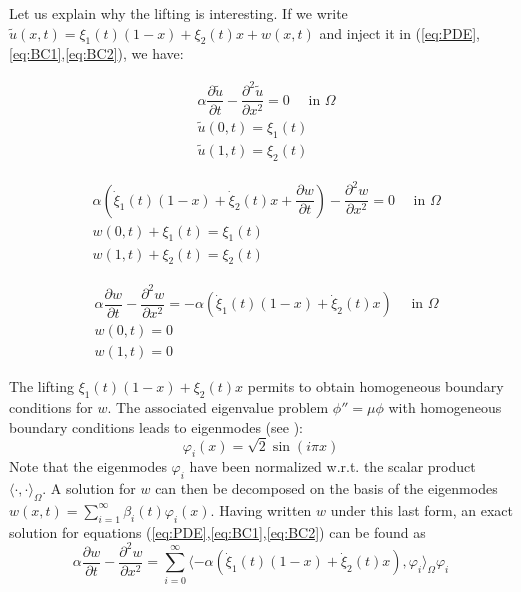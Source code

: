 Let us explain why the lifting is interesting. 
If we write $\tilde u(x,t) =  \xi_1(t)(1-x) + \xi_2(t)x + w(x,t)$ and inject it in (\ref{eq:PDE},\ref{eq:BC1},\ref{eq:BC2}),
we have:


\begin{align*}
& \alpha \dfrac{\partial \tilde u}{ \partial t} -  \dfrac{\partial^2 \tilde u}{ \partial x^2} = 0 \quad\mbox{ in } \Omega \\
& \tilde u (0,t) = \xi_1(t) \\
& \tilde u (1,t) = \xi_2(t)
\end{align*}


\begin{align*} 
& \alpha \left( \dot \xi_1(t)(1-x) + \dot \xi_2(t)x + \dfrac{\partial w}{ \partial t} \right) -  \dfrac{\partial^2 w}{ \partial x^2} = 0 \quad\mbox{ in } \Omega \\
& w(0,t) + \xi_1(t) = \xi_1(t) \\
& w (1,t) + \xi_2(t) = \xi_2(t)
\end{align*}

\begin{align*}
& \alpha \dfrac{\partial w}{ \partial t}  -  \dfrac{\partial^2 w}{ \partial x^2} = -\alpha ( \dot \xi_1(t)(1-x) + \dot \xi_2(t)x) \quad\mbox{ in } \Omega \\
& w(0,t) = 0 \\
& w(1,t) = 0
\end{align*}


The lifting $\xi_1(t)(1-x) + \xi_2(t)x$ permits to obtain homogeneous boundary conditions
for $w$.
The associated eigenvalue problem $\phi'' = \mu \phi$ with homogeneous boundary 
conditions leads to eigenmodes (see \cite{cain2005separation}):
\begin{equation}
\varphi_i(x) = \sqrt{2} \sin{(i \pi x)}
\label{eq:modes}
\end{equation}
Note that the eigenmodes $\varphi_i$ have been normalized w.r.t.
the scalar product $\langle \cdot , \cdot \rangle_\Omega$.
A solution for $w$ can then be decomposed on the basis of 
the eigenmodes $w(x,t) = \sum_{i=1}^\infty \beta_i(t)\varphi_i(x)$.
Having written $w$ under this last form,
an exact solution for equations (\ref{eq:PDE},\ref{eq:BC1},\ref{eq:BC2}) can be found as
\begin{equation}
\alpha \dfrac{\partial w}{ \partial t}  -  \dfrac{\partial^2 w}{ \partial x^2} = \sum_{i=0}^\infty \langle -\alpha ( \dot \xi_1(t)(1-x) + \dot \xi_2(t)x) , \varphi_i \rangle_\Omega \varphi_i
\end{equation}
% 


